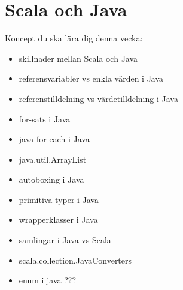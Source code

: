 \chapter{Scala och Java}\label{chapter:W11}
Koncept du ska lära dig denna vecka:
\begin{multicols}{2}\begin{itemize}[nosep,label={$\square$},leftmargin=*]
\item skillnader mellan Scala och Java
\item referensvariabler vs enkla värden i Java
\item referenstilldelning vs värdetilldelning i Java
\item for-sats i Java
\item java for-each i Java
\item java.util.ArrayList
\item autoboxing i Java
\item primitiva typer i Java
\item wrapperklasser i Java
\item samlingar i Java vs Scala
\item scala.collection.JavaConverters
\item enum i java ???\end{itemize}\end{multicols}
